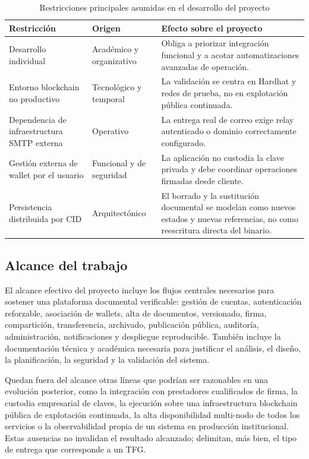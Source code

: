 \documentclass[11pt, a4paper]{article}
\begin{document}
\begin{table}[H]
    \centering
    \small
    \begin{tabular}{|p{3.5cm}|p{3.2cm}|p{6.4cm}|}
    \hline
    \textbf{Restricción} & \textbf{Origen} & \textbf{Efecto sobre el proyecto} \\
    \hline
    Desarrollo individual & Académico y organizativo & Obliga a priorizar integración funcional y a acotar automatizaciones avanzadas de operación. \\
    \hline
    Entorno blockchain no productivo & Tecnológico y temporal & La validación se centra en Hardhat y redes de prueba, no en explotación pública continuada. \\
    \hline
    Dependencia de infraestructura SMTP externa & Operativo & La entrega real de correo exige relay autenticado o dominio correctamente configurado. \\
    \hline
    Gestión externa de wallet por el usuario & Funcional y de seguridad & La aplicación no custodia la clave privada y debe coordinar operaciones firmadas desde cliente. \\
    \hline
    Persistencia distribuida por CID & Arquitectónico & El borrado y la sustitución documental se modelan como nuevos estados y nuevas referencias, no como reescritura directa del binario. \\
    \hline
    \end{tabular}
    \caption{Restricciones principales asumidas en el desarrollo del proyecto}
    \label{tab:restricciones-proyecto}
\end{table}

\subsection{Alcance del trabajo}

El alcance efectivo del proyecto incluye los flujos centrales necesarios para sostener una plataforma documental verificable: gestión de cuentas, autenticación reforzable, asociación de wallets, alta de documentos, versionado, firma, compartición, transferencia, archivado, publicación pública, auditoría, administración, notificaciones y despliegue reproducible. También incluye la documentación técnica y académica necesaria para justificar el análisis, el diseño, la planificación, la seguridad y la validación del sistema.

Quedan fuera del alcance otras líneas que podrían ser razonables en una evolución posterior, como la integración con prestadores cualificados de firma, la custodia empresarial de claves, la ejecución sobre una infraestructura blockchain pública de explotación continuada, la alta disponibilidad multi-nodo de todos los servicios o la observabilidad propia de un sistema en producción institucional. Estas ausencias no invalidan el resultado alcanzado; delimitan, más bien, el tipo de entrega que corresponde a un TFG.
\end{document}
